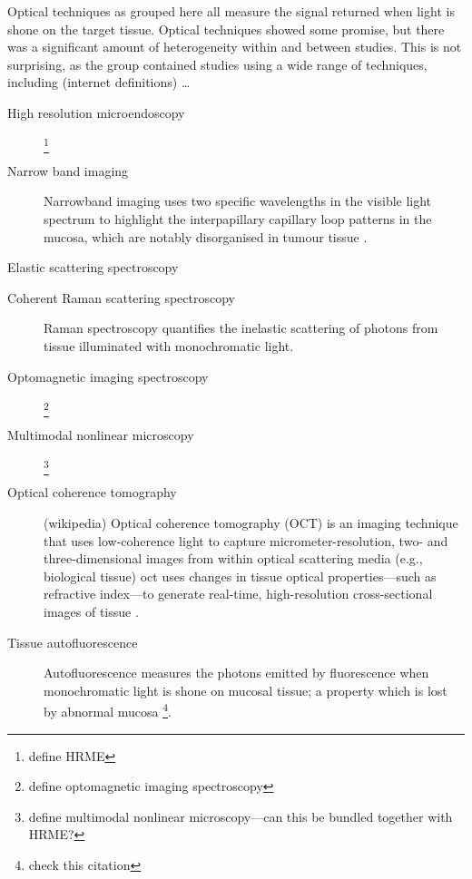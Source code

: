 Optical techniques as grouped here all measure the signal returned when light is shone on the target tissue.
Optical techniques showed some promise, but there was a significant amount of heterogeneity within and between studies. 
This is not surprising, as the group contained studies using a wide range of techniques, including (internet definitions) \ldots
\begin{description}
\item[High resolution microendoscopy] \cite{vilap.m.DiscriminationBenignNeoplastic2012, milesb.a.OperativeMarginControl2015}\footnote{define HRME}
\item[Narrow band imaging] \cite{tirelliNarrowBandImaging2015, tirellig.TailoredResectionsOral2018}Narrowband imaging uses two specific wavelengths in the visible light spectrum to highlight the interpapillary capillary loop patterns in the mucosa, which are notably disorganised in tumour tissue \cite{vuEfficacyNarrowBand2014}.
\item[Elastic scattering spectroscopy] \cite{grilloneg.a.ColorCancerMargin2017}
\item[Coherent Raman scattering spectroscopy] \cite{hoeslir.c.CoherentRamanScattering2017} Raman spectroscopy quantifies the inelastic scattering of photons from tissue illuminated with monochromatic light.
\item[Optomagnetic imaging spectroscopy] \cite{lisulb.PredictiveValueOptomagnetic2019}\footnote{define optomagnetic imaging spectroscopy} 
\item[Multimodal nonlinear microscopy] \cite{heukes.MultimodalNonlinearMicroscopy2016}\footnote{define multimodal nonlinear microscopy---can this be bundled together with HRME?} 
\item[Optical coherence tomography] (wikipedia) Optical coherence tomography (OCT) is an imaging technique that uses low-coherence light to capture micrometer-resolution, two- and three-dimensional images from within optical scattering media (e.g., biological tissue) \cite{hamdoonz.OpticalCoherenceTomography2016} \Gls{oct} uses changes in tissue optical properties---such as refractive index---to generate real-time, high-resolution cross-sectional images of tissue \cite{heidaria.e.UseOpticalCoherence2020}.
\item[Tissue autofluorescence] \cite{ohnishiy.UsefulnessFluorescenceVisualization2016} Autofluorescence measures the photons emitted by fluorescence when monochromatic light is shone on mucosal tissue; a property which is lost by abnormal mucosa \cite{leey.-j.IntraoperativeFluorescenceGuidedSurgery2020}\footnote{check this citation}.
\end{description}










